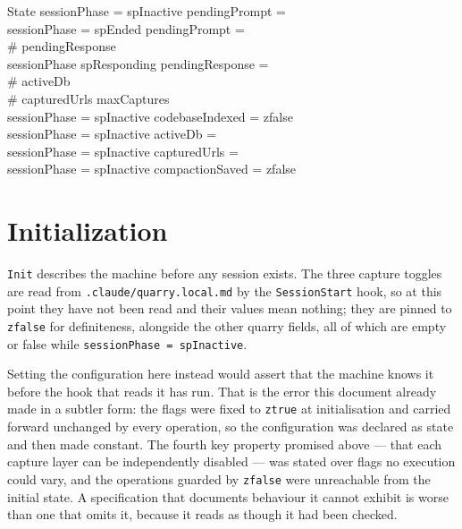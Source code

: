 \documentclass[a4paper,10pt,fleqn]{article}
\begin{document}
\begin{schema}{State}
  sessionPhase = spInactive \implies pendingPrompt = \emptyset \\
  sessionPhase = spEnded \implies pendingPrompt = \emptyset \\
  \# pendingResponse  \\
  sessionPhase \neq spResponding \implies pendingResponse = \emptyset \\
  \# activeDb  \\
  \# capturedUrls \leq maxCaptures \\
  sessionPhase = spInactive \implies codebaseIndexed = zfalse \\
  sessionPhase = spInactive \implies activeDb = \emptyset \\
  sessionPhase = spInactive \implies capturedUrls = \emptyset \\
  sessionPhase = spInactive \implies compactionSaved = zfalse
\end{schema}

\section{Initialization}

\texttt{Init} describes the machine before any session exists. The three
capture toggles are read from \texttt{.claude/quarry.local.md} by the
\texttt{SessionStart} hook, so at this point they have not been read and
their values mean nothing; they are pinned to \texttt{zfalse} for
definiteness, alongside the other quarry fields, all of which are empty
or false while \texttt{sessionPhase = spInactive}.

Setting the configuration here instead would assert that the machine
knows it before the hook that reads it has run. That is the error this
document already made in a subtler form: the flags were fixed to
\texttt{ztrue} at initialisation and carried forward unchanged by every
operation, so the configuration was declared as state and then made
constant. The fourth key property promised above --- that each capture
layer can be independently disabled --- was stated over flags no
execution could vary, and the operations guarded by \texttt{zfalse} were
unreachable from the initial state. A specification that documents
behaviour it cannot exhibit is worse than one that omits it, because it
reads as though it had been checked.
\end{document}
